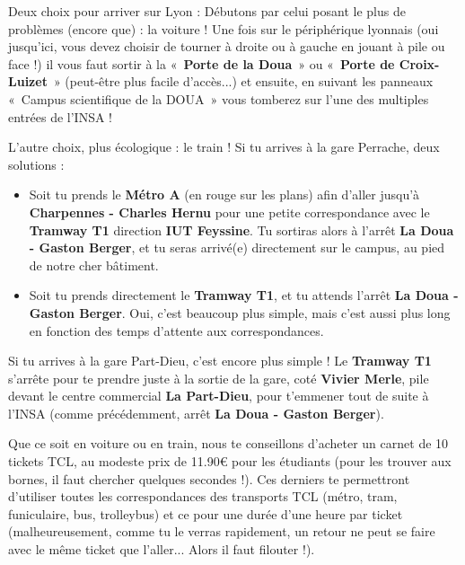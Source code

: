 Deux choix pour arriver sur Lyon :
Débutons par celui posant le plus de problèmes (encore que) : la voiture !
Une fois sur le périphérique lyonnais (oui jusqu'ici, vous devez choisir de tourner à droite ou à gauche en jouant à pile ou face !)
il vous faut sortir à la «~\textbf{Porte de la Doua}~» ou «~\textbf{Porte de
    Croix-Luizet}~» (peut-être plus facile d'accès...)
et ensuite, en suivant les panneaux «~Campus scientifique de la DOUA~»
vous tomberez sur l'une des multiples entrées de l'INSA !

L'autre choix, plus écologique : le train !
Si tu arrives à la gare Perrache, deux solutions :
\begin{itemize}
    \item Soit tu prends le \textbf{Métro A} (en rouge sur les plans) afin
    d'aller jusqu'à \textbf{Charpennes - Charles Hernu} pour une
    petite correspondance avec le \textbf{Tramway T1} direction
    \textbf{IUT Feyssine}. Tu sortiras alors à l'arrêt
    \textbf{La Doua - Gaston Berger}, et tu seras arrivé(e) directement sur le campus, au pied de notre cher bâtiment.

    \item Soit tu prends directement le \textbf{Tramway T1}, et tu
    attends l'arrêt \textbf{La Doua - Gaston Berger}. Oui, c'est
    beaucoup plus simple, mais c'est aussi plus long en fonction des
    temps d'attente aux correspondances.
\end{itemize}


Si tu arrives à la gare Part-Dieu, c'est encore plus simple ! Le
\textbf{Tramway T1} s'arrête pour te prendre juste à la sortie de la gare,
coté \textbf{Vivier Merle}, pile devant le centre commercial \textbf{La Part-Dieu}, pour
t'emmener tout de suite à l'INSA (comme précédemment, arrêt \textbf{La Doua - Gaston Berger}).


Que ce soit en voiture ou en train, nous te conseillons d'acheter un carnet de
10 tickets TCL, au modeste prix de 11.90€ pour les étudiants (pour
les trouver aux bornes, il faut chercher quelques secondes !). Ces derniers te
permettront d'utiliser toutes les correspondances des transports TCL (métro,
tram, funiculaire, bus, trolleybus) et ce pour une durée d'une heure par ticket 
(malheureusement, comme tu le verras rapidement, un retour ne peut se faire
avec le même ticket que l'aller... Alors il faut filouter !).


